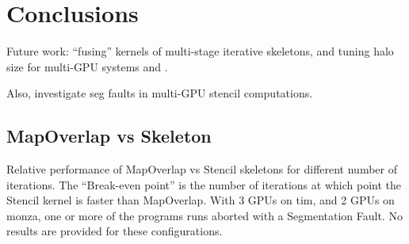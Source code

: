 \newpage
\section{Conclusions}

Future work: ``fusing'' kernels of multi-stage iterative skeletons,
and tuning halo size for multi-GPU systems and .

Also, investigate seg faults in multi-GPU stencil computations.

\label{bibliography}
\printbibliography

\clearpage
\begin{appendices}
\section{MapOverlap vs Skeleton}\label{app:mo-vs-stencil}

Relative performance of MapOverlap vs Stencil skeletons for different
number of iterations. The ``Break-even point'' is the number of
iterations at which point the Stencil kernel is faster than
MapOverlap. With 3 GPUs on tim, and 2 GPUs on monza, one or more of
the programs runs aborted with a Segmentation Fault. No results are
provided for these configurations.

\begin{table}
\footnotesize
\centering

%
\end{table}

\end{appendices}



